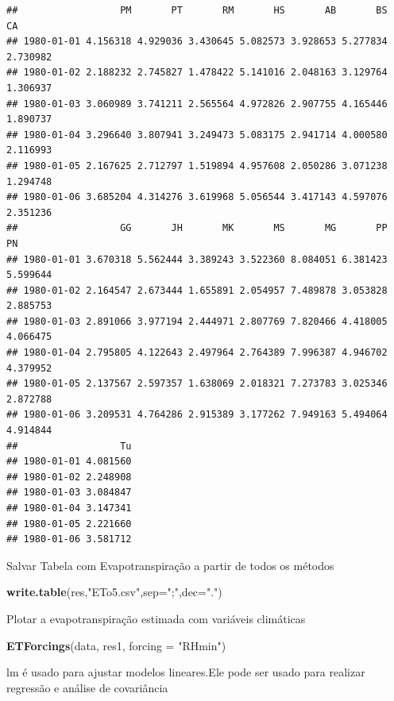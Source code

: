 \documentclass[
]{book}
\newenvironment{Shaded}{\begin{snugshade}}{\end{snugshade}}
\newcommand{\DataTypeTok}[1]{\textcolor[rgb]{0.13,0.29,0.53}{#1}}
\newcommand{\DecValTok}[1]{\textcolor[rgb]{0.00,0.00,0.81}{#1}}
\newcommand{\KeywordTok}[1]{\textcolor[rgb]{0.13,0.29,0.53}{\textbf{#1}}}
\newcommand{\NormalTok}[1]{#1}
\newcommand{\OperatorTok}[1]{\textcolor[rgb]{0.81,0.36,0.00}{\textbf{#1}}}
\newcommand{\StringTok}[1]{\textcolor[rgb]{0.31,0.60,0.02}{#1}}
\begin{document}
\begin{verbatim}
##                  PM       PT       RM       HS       AB       BS       CA
## 1980-01-01 4.156318 4.929036 3.430645 5.082573 3.928653 5.277834 2.730982
## 1980-01-02 2.188232 2.745827 1.478422 5.141016 2.048163 3.129764 1.306937
## 1980-01-03 3.060989 3.741211 2.565564 4.972826 2.907755 4.165446 1.890737
## 1980-01-04 3.296640 3.807941 3.249473 5.083175 2.941714 4.000580 2.116993
## 1980-01-05 2.167625 2.712797 1.519894 4.957608 2.050286 3.071238 1.294748
## 1980-01-06 3.685204 4.314276 3.619968 5.056544 3.417143 4.597076 2.351236
##                  GG       JH       MK       MS       MG       PP       PN
## 1980-01-01 3.670318 5.562444 3.389243 3.522360 8.084051 6.381423 5.599644
## 1980-01-02 2.164547 2.673444 1.655891 2.054957 7.489878 3.053828 2.885753
## 1980-01-03 2.891066 3.977194 2.444971 2.807769 7.820466 4.418005 4.066475
## 1980-01-04 2.795805 4.122643 2.497964 2.764389 7.996387 4.946702 4.379952
## 1980-01-05 2.137567 2.597357 1.638069 2.018321 7.273783 3.025346 2.872788
## 1980-01-06 3.209531 4.764286 2.915389 3.177262 7.949163 5.494064 4.914844
##                  Tu
## 1980-01-01 4.081560
## 1980-01-02 2.248908
## 1980-01-03 3.084847
## 1980-01-04 3.147341
## 1980-01-05 2.221660
## 1980-01-06 3.581712
\end{verbatim}

Salvar Tabela com Evapotranspiração a partir de todos os métodos

\begin{Shaded}
\begin{Highlighting}[]
\KeywordTok{write.table}\NormalTok{(res,}\StringTok{"ETo5.csv"}\NormalTok{,}\DataTypeTok{sep=}\StringTok{";"}\NormalTok{,}\DataTypeTok{dec=}\StringTok{"."}\NormalTok{)}
\end{Highlighting}
\end{Shaded}

Plotar a evapotranspiração estimada com variáveis climáticas

\begin{Shaded}
\begin{Highlighting}[]
\KeywordTok{ETForcings}\NormalTok{(data, res1, }\DataTypeTok{forcing =} \StringTok{"RHmin"}\NormalTok{)}
\end{Highlighting}
\end{Shaded}

lm é usado para ajustar modelos lineares.Ele pode ser usado para realizar regressão e análise de covariância

\begin{Shaded}
\end{Shaded}
\end{document}
